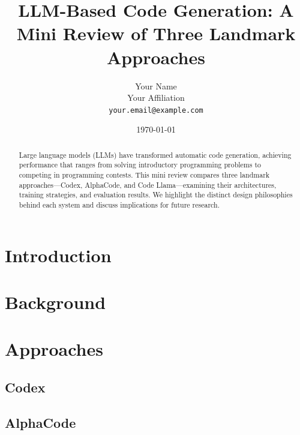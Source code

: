 \documentclass[11pt,a4paper]{article}
\title{LLM-Based Code Generation: A Mini Review of Three Landmark Approaches}
\author{Your Name\\
\small Your Affiliation\\
\small \texttt{your.email@example.com}}
\date{\today}
\begin{document}
\maketitle

\begin{abstract}
Large language models (LLMs) have transformed automatic code generation,
achieving performance that ranges from solving introductory programming problems
to competing in programming contests.
This mini review compares three landmark approaches---Codex, AlphaCode, and
Code Llama---examining their architectures, training strategies, and evaluation
results.
We highlight the distinct design philosophies behind each system and discuss
implications for future research.
\end{abstract}

\section{Introduction}
\label{sec:intro}


\section{Background}
\label{sec:background}


\section{Approaches}
\label{sec:approaches}

\subsection{Codex}
\label{sec:codex}


\subsection{AlphaCode}
\label{sec:alphacode}
\end{document}
